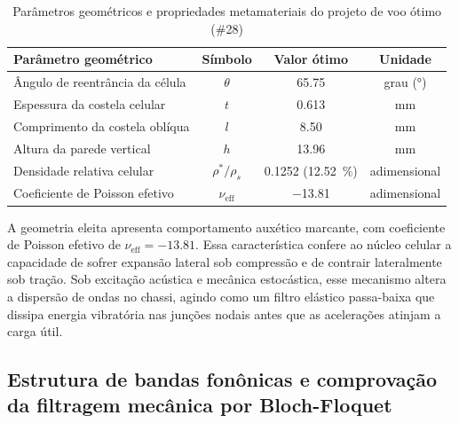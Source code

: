 \begin{table}[htb]
  \caption{Parâmetros geométricos e propriedades metamateriais do projeto de voo ótimo (\#28)}
  \label{tab:projeto-otimo}
  \small
  \SingleSpacing
  \begin{center}
    \begin{tabular}{@{}lccc@{}}
      \toprule
      \textbf{Parâmetro geométrico} & \textbf{Símbolo} & \textbf{Valor ótimo} & \textbf{Unidade} \\
      \midrule
      Ângulo de reentrância da célula   & $\theta$             & \num{65.75}                          & grau (\si{\degree}) \\
      Espessura da costela celular      & $t$                  & \num{0.613}                          & \si{\milli\metre} \\
      Comprimento da costela oblíqua    & $l$                  & \num{8.50}                           & \si{\milli\metre} \\
      Altura da parede vertical         & $h$                  & \num{13.96}                          & \si{\milli\metre} \\
      Densidade relativa celular        & $\rho^{*} / \rho_s$  & \num{0.1252} (\SI{12.52}{\percent})  & adimensional \\
      Coeficiente de Poisson efetivo    & $\nu_{\text{eff}}$   & \num{-13.81}                         & adimensional \\
      \bottomrule
    \end{tabular}
  \end{center}
\end{table}

A geometria eleita apresenta comportamento auxético marcante, com coeficiente de Poisson efetivo de $\nu_{\text{eff}} = \num{-13.81}$. Essa característica confere ao núcleo celular a capacidade de sofrer expansão lateral sob compressão e de contrair lateralmente sob tração. Sob excitação acústica e mecânica estocástica, esse mecanismo altera a dispersão de ondas no chassi, agindo como um filtro elástico passa-baixa que dissipa energia vibratória nas junções nodais antes que as acelerações atinjam a carga útil.

\subsection{Estrutura de bandas fonônicas e comprovação da filtragem mecânica por Bloch-Floquet}
\label{subsec:bloch-resultados}

